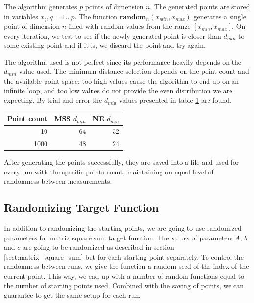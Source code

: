\documentclass[a4paper,english,titlepage,12pt]{article}
\begin{document}
The algorithm generates $p$ points of dimension $n$. The generated points are stored in variables $x_q, q = 1 \dots p$. The function $\mathbf{random}_n(x_{min}, x_{max})$ generates a single point of dimension $n$ filled with random values from the range $[x_{min}, x_{max}]$. On every iteration, we test to see if the newly generated point is closer than $d_{min}$ to some existing point and if it is, we discard the point and try again.

The algorithm used is not perfect since its performance heavily depends on the $d_{min}$ value used. The minimum distance selection depends on the point count and the available point space: too high values cause the algorithm to end up on an infinite loop, and too low values do not provide the even distribution we are expecting. By trial and error the $d_{min}$ values presented in table \ref{tab:dmin_values} are found.

\begin{table}[H]
\centering
{}
\label{tab:dmin_values}
\begin{tabular}{|r|r|r|}
\hline
\rowcolor[HTML]{C0C0C0} 
Point count                       & MSS $d_{min}$ & NE $d_{min}$ \\ \hline
\cellcolor[HTML]{EFEFEF}10   & 64           & 32          \\ \hline
\cellcolor[HTML]{EFEFEF}1000 & 48           & 24          \\ \hline
\end{tabular}
\end{table}

After generating the points successfully, they are saved into a file and used for every run with the specific points count, maintaining an equal level of randomness between measurements.

\subsection{Randomizing Target Function}

In addition to randomizing the starting points, we are going to use randomized parameters for matrix square sum target function. The values of parameters $A$, $b$ and $c$ are going to be randomized as described in section \ref{sect:matrix_square_sum} but for each starting point separately. To control the randomness between runs, we give the function a random seed of the index of the current point. This way, we end up with a number of random functions equal to the number of starting points used. Combined with the saving of points, we can guarantee to get the same setup for each run.
\end{document}
